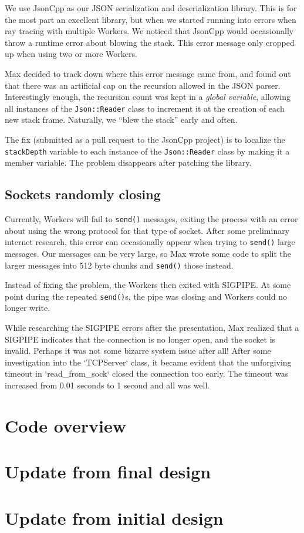 \documentclass[letterpaper,twocolumn,10pt]{article}
\begin{document}
We use JsonCpp as our JSON serialization and deserialization library. This is
for the most part an excellent library, but when we started running into errors
when ray tracing with multiple Workers. We noticed that JsonCpp would
occasionally throw a runtime error about blowing the stack. This error message
only cropped up when using two or more Workers.

Max decided to track down where this error message came from, and found out that
there was an artificial cap on the recursion allowed in the JSON
parser. Interestingly enough, the recursion count was kept in a \textit{global
  variable}, allowing all instances of the \verb|Json::Reader| class to
increment it at the creation of each new stack frame. Naturally, we ``blew the
stack'' early and often.

The fix (submitted as a pull request to the JsonCpp project) is to localize the
\verb|stackDepth| variable to each instance of the \verb|Json::Reader| class by
making it a member variable. The problem disappears after patching the library.

\subsection{Sockets randomly closing}

Currently, Workers will fail to \verb|send()| messages, exiting the process with
an error about using the wrong protocol for that type of socket. After some
preliminary internet research, this error can occasionally appear when trying to
\verb|send()| large messages. Our messages can be very large, so Max wrote some
code to split the larger messages into 512 byte chunks and \verb|send()| those
instead.

Instead of fixing the problem, the Workers then exited with SIGPIPE. At some
point during the repeated \verb|send()|s, the pipe was closing and Workers could
no longer write.

While researching the SIGPIPE errors after the presentation, Max realized that a
SIGPIPE indicates that the connection is no longer open, and the socket is
invalid. Perhaps it was not some bizarre system issue after all! After some
investigation into the `TCPServer` class, it became evident that the unforgiving
timeout in `read_from_sock` closed the connection too early. The timeout was
increased from 0.01 seconds to 1 second and all was well.

\section{Code overview}


\section{Update from final design}



\section{Update from initial design}


\end{document}
